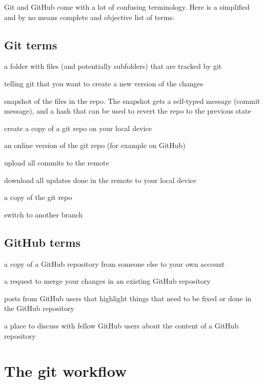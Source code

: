 \documentclass[
  letterpaper,
  DIV=11,
  numbers=noendperiod,
  oneside]{scrreprt}
\providecommand{\tightlist}{%
  \setlength{\itemsep}{0pt}\setlength{\parskip}{0pt}}
\begin{document}
\begin{tcolorbox}
Git and GitHub come with a lot of confusing terminology. Here is a
simplified and by no means complete and objective list of terms:

\subsection{Git terms}

\begin{description}
\tightlist
\item[git repo / git repository]
a folder with files (and potentially subfolders) that are tracked by git
\item[staging]
telling git that you want to create a new version of the changes
\item[commit]
snapshot of the files in the repo. The snapshot gets a self-typed
message (commit message), and a hash that can be used to revert the repo
to the previous state
\item[clone]
create a copy of a git repo on your local device
\item[remote]
an online version of the git repo (for example on GitHub)
\item[push]
upload all commits to the remote
\item[pull]
download all updates done in the remote to your local device
\item[branch]
a copy of the git repo
\item[checkout]
switch to another branch
\end{description}

\subsection{GitHub terms}

\begin{description}
\tightlist
\item[fork]
a copy of a GitHub repository from someone else to your own account
\item[pull request]
a request to merge your changes in an existing GitHub repository
\item[issues]
posts from GitHub users that highlight things that need to be fixed or
done in the GitHub repository
\item[GitHub discussion]
a place to discuss with fellow GitHub users about the content of a
GitHub repository
\end{description}

\section{The git workflow}\label{the-git-workflow}


\end{tcolorbox}
\end{document}
